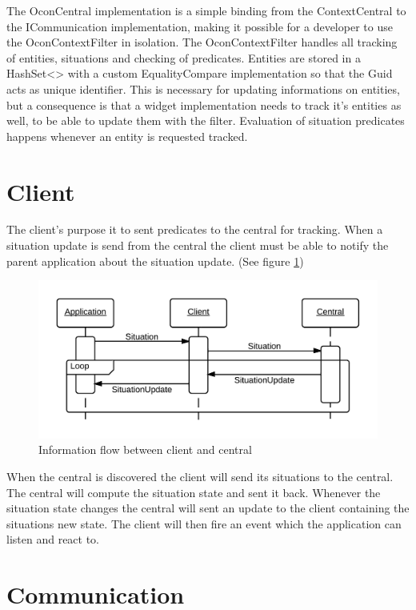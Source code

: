 \documentclass[../report.tex]{subfiles}
\begin{document}
The OconCentral implementation is a simple binding from the ContextCentral to the ICommunication implementation, making it possible for a developer to use the OconContextFilter in isolation. The OconContextFilter handles all tracking of entities, situations and checking of predicates. Entities are stored in a HashSet<> with a custom EqualityCompare implementation so that the Guid acts as unique identifier. This is necessary for updating informations on entities, but a consequence is that a widget implementation needs to track it's entities as well, to be able to update them with the filter. Evaluation of situation predicates happens whenever an entity is requested tracked.


\section{Client}

The client's purpose it to sent predicates to the central for tracking. When a situation update is send from the central the client must be able to notify the parent application about the situation update. (See figure \ref{seqclient})

\begin{figure}[h]
\centering
\includegraphics[width=\linewidth]{clientsequencediagram.png}
\caption{Information flow between client and central}
\label{seqclient}
\end{figure}

When the central is discovered the client will send its situations to the central. The central will compute the situation state and sent it back. Whenever the situation state changes the central will sent an update to the client containing the situations new state. The client will then fire an event which the application can listen and react to.

\section{Communication}
\end{document}
